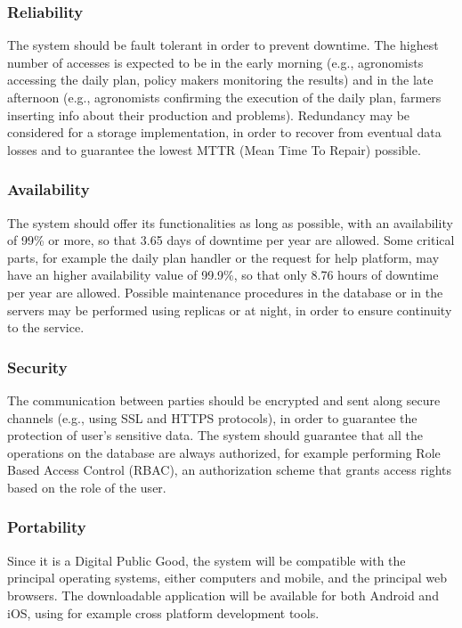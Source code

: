 \subsubsection{Reliability}
The system should be fault tolerant in order to prevent downtime. The highest number of accesses is expected to be in the early morning (e.g., agronomists accessing the daily plan, policy makers monitoring the results) and in the late afternoon (e.g., agronomists confirming the execution of the daily plan, farmers inserting info about their production and problems).
\newline
Redundancy may be considered for a storage implementation, in order to recover from eventual data losses and to guarantee the lowest MTTR (Mean Time To Repair) possible.
\subsubsection{Availability}
The system should offer its functionalities as long as possible, with an availability of 99\% or more, so that 3.65 days of downtime per year are allowed. Some critical parts, for example the daily plan handler or the request for help platform, may have an higher availability value of 99.9\%, so that only 8.76 hours of downtime per year are allowed. 
\newline
Possible maintenance procedures in the database or in the servers may be performed using replicas or at night, in order to ensure continuity to the service.
\subsubsection{Security}
The communication between parties should be encrypted and sent along secure channels (e.g., using SSL and HTTPS protocols), in order to guarantee the protection of user’s sensitive data. 
\newline
The system should guarantee that all the operations on the database are always authorized, for example performing Role Based Access Control (RBAC), an authorization scheme that grants access rights based on the role of the user.
\subsubsection{Portability}
Since it is a Digital Public Good, the system will be compatible with the principal operating systems, either computers and mobile, and the principal web browsers. The downloadable application will be available for both Android and iOS, using for example cross platform development tools.
